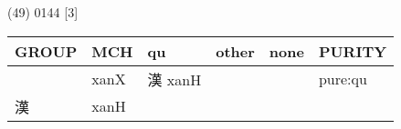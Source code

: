\documentclass[14pt,a4paper]{scrartcl}
\begin{document}
(49) 0144 {[}3{]}

\begin{longtable}[c]{@{}llllll@{}}
\toprule
\begin{minipage}[b]{0.14\columnwidth}\raggedright\strut
GROUP
\strut\end{minipage} &
\begin{minipage}[b]{0.14\columnwidth}\raggedright\strut
MCH
\strut\end{minipage} &
\begin{minipage}[b]{0.14\columnwidth}\raggedright\strut
qu
\strut\end{minipage} &
\begin{minipage}[b]{0.14\columnwidth}\raggedright\strut
other
\strut\end{minipage} &
\begin{minipage}[b]{0.14\columnwidth}\raggedright\strut
none
\strut\end{minipage} &
\begin{minipage}[b]{0.14\columnwidth}\raggedright\strut
PURITY
\strut\end{minipage}\tabularnewline
\midrule
\endhead
\begin{minipage}[t]{0.14\columnwidth}\raggedright\strut
𩁢
\strut\end{minipage} &
\begin{minipage}[t]{0.14\columnwidth}\raggedright\strut
xanX
\strut\end{minipage} &
\begin{minipage}[t]{0.14\columnwidth}\raggedright\strut
漢 xanH
\strut\end{minipage} &
\begin{minipage}[t]{0.14\columnwidth}\raggedright\strut
\strut\end{minipage} &
\begin{minipage}[t]{0.14\columnwidth}\raggedright\strut
\strut\end{minipage} &
\begin{minipage}[t]{0.14\columnwidth}\raggedright\strut
pure:qu
\strut\end{minipage}\tabularnewline
\begin{minipage}[t]{0.14\columnwidth}\raggedright\strut
漢
\strut\end{minipage} &
\begin{minipage}[t]{0.14\columnwidth}\raggedright\strut
xanH
\strut\end{minipage} &
\begin{minipage}[t]{0.14\columnwidth}\raggedright\strut
\strut\end{minipage} &

\end{longtable}
\end{document}
